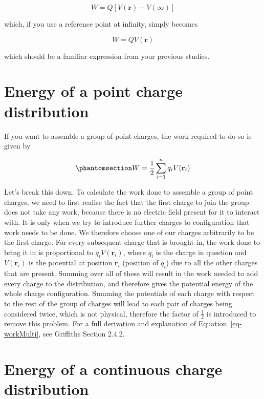 \documentclass[
  letterpaper,
  DIV=11,
  numbers=noendperiod]{scrreprt}
\begin{document}
\[W = Q[V(\mathrm{\mathbf{r}}) - V(\infty)]\]

which, if you use a reference point at infinity, simply becomes

\[W = Q V(\mathrm{\mathbf{r}})\]

which should be a familiar expression from your previous studies.

\section{Energy of a point charge
distribution}\label{energy-of-a-point-charge-distribution}

If you want to assemble a group of point charges, the work required to
do so is given by

\begin{equation}\phantomsection\label{eq-workMulti}{ W = \frac{1}{2} \sum_{i=1}^n q_i V(\mathrm{\mathbf{r}}_i) }\end{equation}

Let's break this down. To calculate the work done to assemble a group of
point charges, we need to first realise the fact that the first charge
to join the group does not take any work, because there is no electric
field present for it to interact with. It is only when we try to
introduce further charges to configuration that work needs to be done.
We therefore choose one of our charges arbitrarily to be the first
charge. For every subsequent charge that is brought in, the work done to
bring it in is proportional to \(q_i V(\mathrm{\mathbf{r}}_i)\), where
\(q_i\) is the charge in question and \(V(\mathrm{\mathbf{r}}_i)\) is
the potential at position \(\mathrm{\mathbf{r}}_i\) (position of
\(q_i\)) due to all the other charges that are present. Summing over all
of these will result in the work needed to add every charge to the
distribution, and therefore gives the potential energy of the whole
charge configuration. Summing the potentials of each charge with respect
to the rest of the group of charges will lead to each pair of charges
being considered twice, which is not physical, therefore the factor of
\(\frac{1}{2}\) is introduced to remove this problem. For a full
derivation and explanation of Equation~\ref{eq-workMulti}, see Griffiths
Section 2.4.2.

\section{Energy of a continuous charge
distribution}\label{energy-of-a-continuous-charge-distribution}
\end{document}
